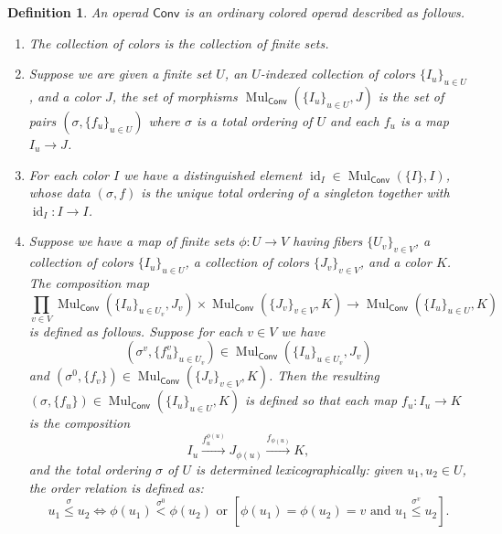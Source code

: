 \documentclass[10pt]{amsart}
\newtheorem{defn}[subsubsection]{Definition}
\theoremstyle{remark}
\newcommand{\te}{\text}
\newcommand{\on}{\operatorname}
\newcommand{\id}{\on{id}}
\newcommand{\Mul}{\on{Mul}}
\newcommand{\Conv}{\mathsf{Conv}}
\begin{document}
\begin{defn}\label{def: operad Conv}
    An operad $\Conv$ is an ordinary colored operad described as follows.
    \begin{enumerate}
        \item The collection of colors is the collection of finite sets.
        \item Suppose we are given a finite set $U$, an $U$-indexed collection of colors $\{I_u\}_{u\in U}$, and a color $J$, the set of morphisms $\Mul_{\Conv}(\{I_u\}_{u\in U}, J)$ is the set of pairs $(\sigma, \{f_{u}\}_{u\in U})$ where $\sigma$ is a total ordering of $U$ and each $f_u$ is a map $I_u\rightarrow J$.
        \item For each color $I$ we have a distinguished element
        $\id_I\in \Mul_{\Conv}(\{I\},I)$,
        whose data $(\sigma,f)$ is the unique total ordering of a singleton together with $\id_I:I\rightarrow I$.
        \item Suppose we have a map of finite sets $\phi:U\rightarrow V$ having fibers $\{U_v\}_{v\in V}$, a collection of colors $\{I_u\}_{u\in U}$, a collection of colors $\{J_v\}_{v\in V}$, and a color $K$. The composition map
        \begin{equation}\label{eq: composition Conv}
            \prod_{v\in V} \Mul_{\Conv}(\{I_u\}_{u\in U_v}, J_v)\times \Mul_{\Conv}(\{J_v\}_{v\in V}, K)\rightarrow \Mul_{\Conv}(\{I_u\}_{u\in U}, K)
        \end{equation}
        is defined as follows. Suppose for each $v\in V$ we have 
        \[(\sigma^v, \{f^v_u\}_{u\in U_v})\in \Mul_{\Conv}(\{I_u\}_{u\in U_v}, J_v)\]
        and
        $(\sigma^0, \{f_v\})\in \Mul_{\Conv}(\{J_v\}_{v\in V}, K)$.
        Then the resulting
        $(\sigma,\{f_u\})\in \Mul_{\Conv}(\{I_u\}_{u\in U}, K)$
        is defined so that each map $f_u: I_u\rightarrow K$ is the composition
        \[I_u\xrightarrow{f^{\phi(u)}_u}J_{\phi(u)}\xrightarrow{f_{\phi(u)}}K,\]
        and the total ordering $\sigma$ of $U$ is determined lexicographically: given $u_1,u_2\in U$, the order relation is defined as:
        \begin{equation}\label{eq: lexicographic}
        u_1\stackrel{\sigma}{\le} u_2\iff \phi(u_1)\stackrel{\sigma^0}{<}\phi(u_2)\te{ or } \left[\phi(u_1)=\phi(u_2)=v\te{ and } u_1\stackrel{\sigma^v}{\le} u_2\right].
        \end{equation}
    \end{enumerate}
\end{defn}
\end{document}
